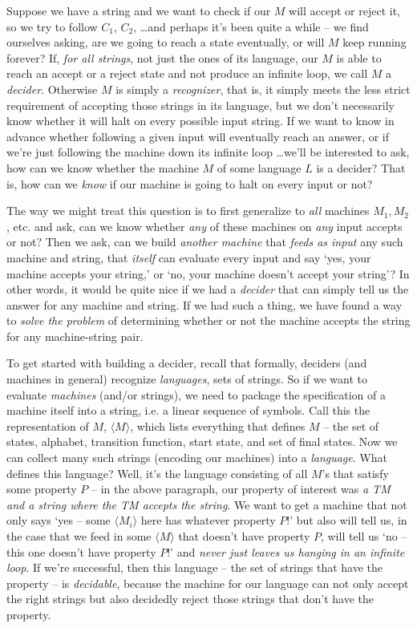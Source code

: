 \documentclass[11pt]{article}
\begin{document}
Suppose we have a string and we want to check if our $M$ will accept or reject it, so we try to follow $C_1$, $C_2$, \ldots and perhaps it’s been quite a while – we find ourselves asking, are we going to reach a state eventually, or will $M$ keep running forever? If, \emph{for all strings}, not just the ones of its language, our $M$ is able to reach an accept or a reject state and not produce an infinite loop, we call $M$ a \emph{decider}. Otherwise $M$ is simply a \emph{recognizer}, that is, it simply meets the less strict requirement of accepting those strings in its language, but we don’t necessarily know whether it will halt on every possible input string. If we want to know in advance whether following a given input will eventually reach an answer, or if we’re just following the machine down its infinite loop \ldots we’ll be interested to ask, how can we know whether the machine $M$ of some language $L$ is a decider? That is, how can we \emph{know} if our machine is going to halt on every input or not? 

The way we might treat this question is to first generalize to \emph{all} machines $M_1, M_2$, etc. and ask, can we know whether \emph{any} of these machines on \emph{any} input accepts or not? Then we ask, can we build \emph{another machine} that \emph{feeds as input} any such machine and string, that \emph{itself} can evaluate every input and say `yes, your machine accepts your string,' or `no, your machine doesn't accept your string'? In other words, it would be quite nice if we had a \emph{decider} that can simply tell us the answer for any machine and string. If we had such a thing, we have found a way to \emph{solve the problem} of determining whether or not the machine accepts the string for any machine-string pair.

To get started with building a decider, recall that formally, deciders (and machines in general) recognize \emph{languages}, sets of strings. So if we want to evaluate \emph{machines} (and/or strings), we need to package the specification of a machine itself into a string, i.e. a linear sequence of symbols. Call this the representation of $M$, $\langle M \rangle$, which lists everything that defines $M$ -- the set of states, alphabet, transition function, start state, and set of final states. Now we can collect many such strings (encoding our machines) into a \emph{language}. What defines this language? Well, it's the language consisting of all $M$'s that satisfy some property $P$ -- in the above paragraph, our property of interest was \emph{a TM and a string where the TM accepts the string}. We want to get a machine that not only says ‘yes – some $\langle M_i \rangle$ here has whatever property $P$!’ but also will tell us, in the case that we feed in some $\langle M \rangle$ that doesn’t have property $P$, will tell us ‘no – this one doesn’t have property $P$!’ and \emph{never just leaves us hanging in an infinite loop}. If we’re successful, then this language – the set of strings that have the property – is \emph{decidable}, because the machine for our language can not only accept the right strings but also decidedly reject those strings that don’t have the property. 
\end{document}
